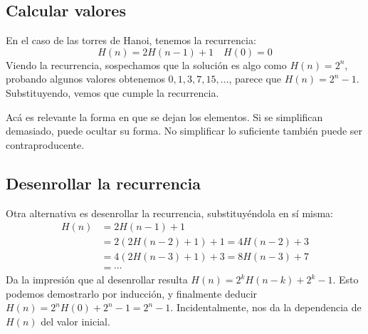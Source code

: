 \subsection{Calcular valores}
\label{sec:calcular-valores}

  En el caso de las torres de Hanoi,
  tenemos la recurrencia:
  \begin{equation*}
    H(n)
      = 2 H(n - 1) + 1
      \quad H(0) = 0
  \end{equation*}
  Viendo la recurrencia,
  sospechamos que la solución es algo como \(H(n) = 2^n\),
  probando algunos valores obtenemos \(0, 1, 3, 7, 15, \dotsc\),
  parece que \(H(n) = 2^n - 1\).
  Substituyendo,
  vemos que cumple la recurrencia.

  Acá es relevante la forma en que se dejan los elementos.
  Si se simplifican demasiado,
  puede ocultar su forma.
  No simplificar lo suficiente también puede ser contraproducente.

\subsection{Desenrollar la recurrencia}
\label{sec:desenrollar-recurrencia}

  Otra alternativa es desenrollar la recurrencia,
  substituyéndola en sí misma:
  \begin{align*}
    H(n)
      &= 2 H(n - 1) + 1 \\
      &= 2 (2 H(n - 2) + 1) + 1
       = 4 H(n - 2) + 3 \\
      &= 4 (2 H(n - 3) + 1) + 3
       = 8 H(n - 3) + 7 \\
      &= \dotsb
  \end{align*}
  Da la impresión que al desenrollar
  resulta \(H(n) = 2^k H(n - k) + 2^k - 1\).
  Esto podemos demostrarlo por inducción,
  y finalmente deducir \(H(n) = 2^n H(0) + 2^n - 1 = 2^n - 1\).
  Incidentalmente,
  nos da la dependencia de \(H(n)\) del valor inicial.

